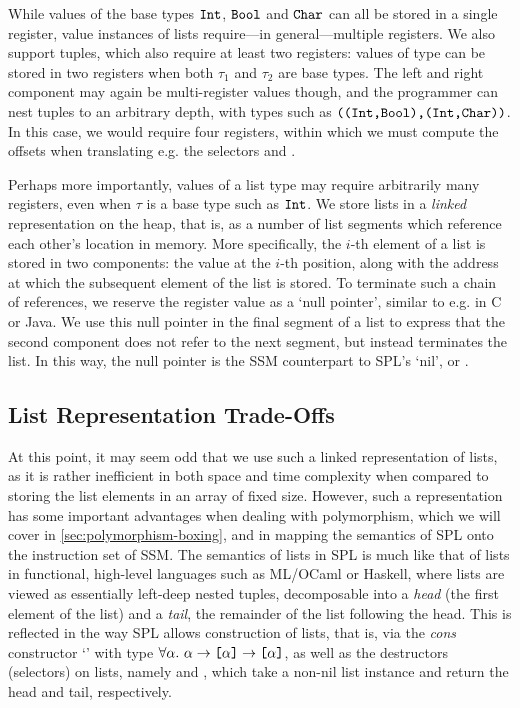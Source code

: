 While values of the base types $\texttt{Int}$, $\texttt{Bool}$ and $\texttt{Char}$ can all be
stored in a single register, value instances of lists
require---in general---multiple registers.
We also support tuples, which also require at least two registers:
values of type  can be stored in two registers
when both $\tau_1$ and $\tau_2$ are base types.
The left and right component may again be multi-register values though, and
the programmer can nest tuples to an arbitrary depth, with types such as
$\texttt{(}\texttt{(}\texttt{Int}\texttt{,}\texttt{Bool}\texttt{)}\texttt{,}\texttt{(}\texttt{Int}\texttt{,}\texttt{Char}\texttt{)}\texttt{)}$. In this case, we would
require four registers, within which we must compute the offsets when
translating e.g. the selectors  and .

Perhaps more importantly, values of a list type \code{[$\tau$]} may require
arbitrarily many registers, even when $\tau$ is a base type such as $\texttt{Int}$.
We store lists in a \emph{linked} representation on the heap, that is, as a
number of list segments which reference each other's location in memory.
More specifically, the $i$-th element of a list is stored in two components: the
value at the $i$-th position, along with the address at which the subsequent
element of the list is stored.
To terminate such a chain of references, we reserve the register value
 as a `null pointer', similar to e.g.  in C or Java.
We use this null pointer in the final segment of a list to express that the
second component does not refer to the next segment, but instead terminates the
list. In this way, the null pointer is the SSM counterpart to SPL's `nil', or
\spl{[]}.

\subsection{List Representation Trade-Offs}
At this point, it may seem odd that we use such a linked representation of
lists, as it is rather inefficient in both space and time complexity when
compared to storing the list elements in an array of fixed size.
However, such a representation has some important advantages when dealing with
polymorphism, which we will cover in \cref{sec:polymorphism-boxing}, and in
mapping the semantics of SPL onto the instruction set of SSM.
The semantics of lists in SPL is much like that of lists in functional,
high-level languages such as ML/OCaml or Haskell, where lists are viewed as
essentially left-deep nested tuples, decomposable into a \emph{head} (the first
element of the list) and a \emph{tail}, the remainder of the list following the
head. This is reflected in the way SPL allows construction of lists, that is,
via the \emph{cons} constructor `\spl{:}' with type
$\forall \alpha.\ \alpha \to \TList{\alpha} \to \TList{\alpha}$, as well as the
destructors (selectors) on lists, namely  and , which take a
non-nil list instance and return the head and tail, respectively.

